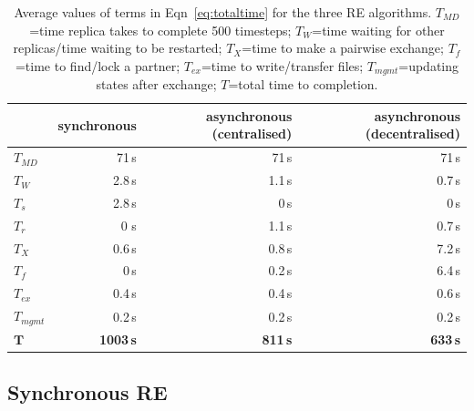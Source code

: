 \documentclass{rspublic}
\newcommand{\alnote}[1]{ {\textcolor{blue} { ***andre: #1 }}}
\newcommand{\athotanote}[1]{ {\textcolor{green} { ***athota: #1 }}}
\newcommand{\alnote}[1]{}
\newcommand{\athotanote}[1]{}
\begin{document}
\begin{table}
    \centering
	\begin{tabular}{|l|r|r|r|}
	\hline
	                        &\textbf{synchronous}  &\textbf{asynchronous (centralised)} 
	                        &\textbf{asynchronous (decentralised)}\\
	\hline
	\hline
	$T_{MD}$       &71\,s &71\,s &71\,s\\
	\hline
	\hline
	$T_{W}$        &2.8\,s &1.1\,s &0.7\,s\\
    \hline
    \hspace{2mm}$T_{s}$ &2.8\,s &0\,s &0\,s\\ 
    \hline
    \hspace{2mm}$T_{r}$ &0 s&1.1\,s &0.7\,s\\
	\hline\hline
	$T_{X}$        &0.6\,s &0.8\,s &7.2\,s\\
	\hline
	\hspace{2mm}$T_{f}$        &0\,s   &0.2\,s &6.4\,s\\
	\hline
	\hspace{2mm}$T_{ex}$       &0.4\,s &0.4\,s &0.6\,s\\
	\hline
    \hspace{2mm}$T_{mgmt}$    &0.2\,s &0.2\,s  &0.2\,s\\
	\hline
	\hline
	$\mathbf{T}$        &\textbf{1003\,s} &\textbf{811\,s}    &\textbf{633\,s}\\
	\hline
    \end{tabular}
    \caption{Average values of terms in Eqn~\ref{eq:totaltime} for the three RE algorithms. $T_{MD}$=time replica takes to complete 500 timesteps; $T_W$=time waiting for other replicas/time waiting to be restarted; $T_X$=time to make a pairwise exchange; $T_f$=time to find/lock a partner; $T_{ex}$=time to write/transfer files; $T_{mgmt}$=updating states after exchange; $T$=total time to completion.}
	\label{table:repex_perf}
\end{table}

\subsection{Synchronous RE}
\label{sec:impl_sync_re}
\end{document}
